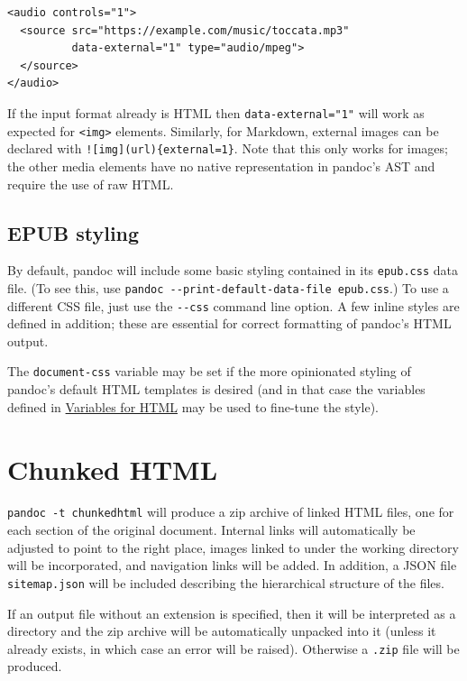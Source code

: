 \documentclass[
]{article}
\begin{document}
\begin{verbatim}
<audio controls="1">
  <source src="https://example.com/music/toccata.mp3"
          data-external="1" type="audio/mpeg">
  </source>
</audio>
\end{verbatim}

If the input format already is HTML then \texttt{data-external="1"} will
work as expected for \texttt{\textless{}img\textgreater{}} elements.
Similarly, for Markdown, external images can be declared with
\texttt{!{[}img{]}(url)\{external=1\}}. Note that this only works for
images; the other media elements have no native representation in
pandoc's AST and require the use of raw HTML.

\hypertarget{epub-styling}{%
\subsection{EPUB styling}\label{epub-styling}}

By default, pandoc will include some basic styling contained in its
\texttt{epub.css} data file. (To see this, use
\texttt{pandoc\ -\/-print-default-data-file\ epub.css}.) To use a
different CSS file, just use the \texttt{-\/-css} command line option. A
few inline styles are defined in addition; these are essential for
correct formatting of pandoc's HTML output.

The \texttt{document-css} variable may be set if the more opinionated
styling of pandoc's default HTML templates is desired (and in that case
the variables defined in
\protect\hyperlink{variables-for-html}{Variables for HTML} may be used
to fine-tune the style).

\hypertarget{chunked-html}{%
\section{Chunked HTML}\label{chunked-html}}

\texttt{pandoc\ -t\ chunkedhtml} will produce a zip archive of linked
HTML files, one for each section of the original document. Internal
links will automatically be adjusted to point to the right place, images
linked to under the working directory will be incorporated, and
navigation links will be added. In addition, a JSON file
\texttt{sitemap.json} will be included describing the hierarchical
structure of the files.

If an output file without an extension is specified, then it will be
interpreted as a directory and the zip archive will be automatically
unpacked into it (unless it already exists, in which case an error will
be raised). Otherwise a \texttt{.zip} file will be produced.
\end{document}
